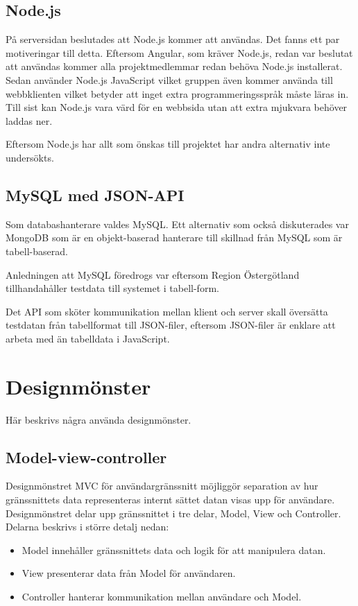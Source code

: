 \documentclass[a4paper,10pt]{article}
\begin{document}
\subsection{Node.js}
På serversidan beslutades att Node.js kommer att användas. Det fanns ett par motiveringar till detta. Eftersom Angular, som kräver Node.js, redan var beslutat att användas kommer alla projektmedlemmar redan behöva Node.js installerat. Sedan använder Node.js JavaScript vilket gruppen även kommer använda till webbklienten vilket betyder att inget extra programmeringsspråk måste läras in. Till sist kan Node.js vara värd för en webbsida utan att extra mjukvara behöver laddas ner.

Eftersom Node.js har allt som önskas till projektet har andra alternativ inte undersökts.

\subsection{MySQL med JSON-API}
Som databashanterare valdes MySQL. Ett alternativ som också diskuterades var MongoDB som är en objekt-baserad hanterare \cite{mongodbintro} till skillnad från MySQL som är tabell-baserad.

Anledningen att MySQL föredrogs var eftersom Region Östergötland tillhandahåller testdata till systemet i tabell-form.

Det API som sköter kommunikation mellan klient och server skall översätta testdatan från tabellformat till JSON-filer, eftersom JSON-filer är enklare att arbeta med än tabelldata i JavaScript.

\section{Designmönster}
Här beskrivs några använda designmönster.

\subsection{Model-view-controller}
Designmönstret MVC för användargränssnitt möjliggör separation av hur gränssnittets data representeras internt sättet datan visas upp för användare. Designmönstret delar upp gränssnittet i tre delar, Model, View och Controller. \cite{mvc} Delarna beskrivs i större detalj nedan:
\begin{itemize}
  \item Model innehåller gränssnittets data och logik för att manipulera datan.
  \item View presenterar data från Model för användaren.
  \item Controller hanterar kommunikation mellan användare och Model.
\end{itemize}
\end{document}
